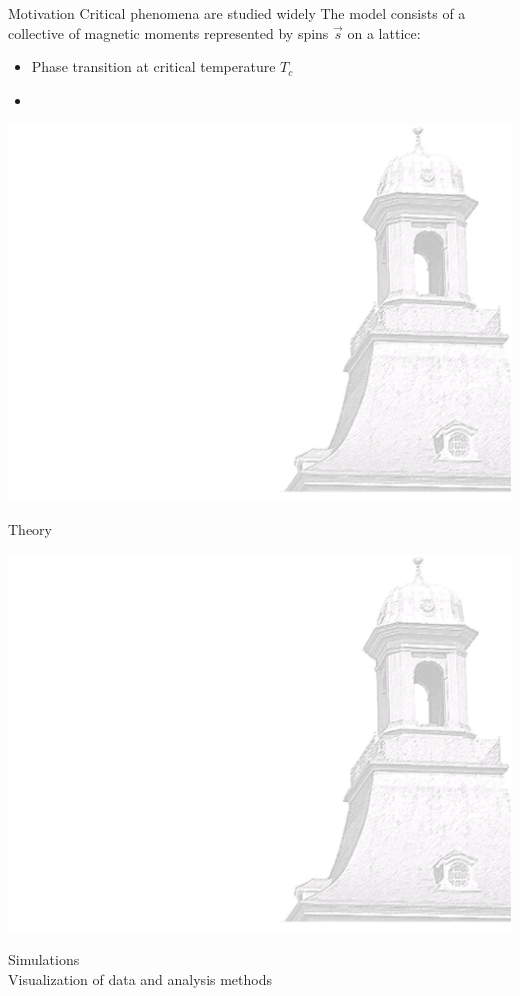\documentclass[xcolor=dvipsnames]{beamer}
\begin{document}
	\begin{frame}{Motivation}
		Critical phenomena are studied widely  
		The  model consists of a collective of magnetic moments represented by spins $\vec{s}$ on a lattice:
		\begin{itemize}
			\item Phase transition at critical temperature $T_c$
			\item 
		\end{itemize}
	\end{frame}
	
	{\usebackgroundtemplate%
		{%
			\includegraphics[width=\paperwidth,height=\paperheight]{bkg1.pdf}%
		}
		\begin{frame}
			\centering \Huge \color{ublue} Theory
			\thispagestyle{empty}
			\addtocounter{framenumber}{-1}
		\end{frame}
	}
	
	{\usebackgroundtemplate%
		{%
			\includegraphics[width=\paperwidth,height=\paperheight]{bkg1.pdf}%
		}
		\begin{frame}
			\centering \Huge \color{ublue} Simulations \\ \Large Visualization of data and analysis methods
			\thispagestyle{empty}
			\addtocounter{framenumber}{-1}
		\end{frame}
	}
	
\end{document}
